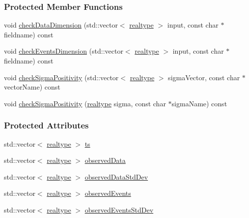 \subsubsection*{Protected Member Functions}
\begin{DoxyCompactItemize}
\item 
void \mbox{\hyperlink{classamici_1_1_exp_data_acad115e928a8b0bc8e90ebf9553d3eed}{check\+Data\+Dimension}} (std\+::vector$<$ \mbox{\hyperlink{namespaceamici_a1bdce28051d6a53868f7ccbf5f2c14a3}{realtype}} $>$ input, const char $\ast$fieldname) const
\item 
void \mbox{\hyperlink{classamici_1_1_exp_data_adcf5587f972fdef595fff78123f5118a}{check\+Events\+Dimension}} (std\+::vector$<$ \mbox{\hyperlink{namespaceamici_a1bdce28051d6a53868f7ccbf5f2c14a3}{realtype}} $>$ input, const char $\ast$fieldname) const
\item 
void \mbox{\hyperlink{classamici_1_1_exp_data_a30d756faaf9ea395446fbc5c65a7b125}{check\+Sigma\+Positivity}} (std\+::vector$<$ \mbox{\hyperlink{namespaceamici_a1bdce28051d6a53868f7ccbf5f2c14a3}{realtype}} $>$ sigma\+Vector, const char $\ast$vector\+Name) const
\item 
void \mbox{\hyperlink{classamici_1_1_exp_data_a0ed66c4deb1937ad309e8c52a452d9eb}{check\+Sigma\+Positivity}} (\mbox{\hyperlink{namespaceamici_a1bdce28051d6a53868f7ccbf5f2c14a3}{realtype}} sigma, const char $\ast$sigma\+Name) const
\end{DoxyCompactItemize}
\subsubsection*{Protected Attributes}
\begin{DoxyCompactItemize}
\item 
std\+::vector$<$ \mbox{\hyperlink{namespaceamici_a1bdce28051d6a53868f7ccbf5f2c14a3}{realtype}} $>$ \mbox{\hyperlink{classamici_1_1_exp_data_aa7014a80e7b102f85a10e3b9a480e8e5}{ts}}
\item 
std\+::vector$<$ \mbox{\hyperlink{namespaceamici_a1bdce28051d6a53868f7ccbf5f2c14a3}{realtype}} $>$ \mbox{\hyperlink{classamici_1_1_exp_data_a6acedf749a3c5e4c4dcbc822f58a565d}{observed\+Data}}
\item 
std\+::vector$<$ \mbox{\hyperlink{namespaceamici_a1bdce28051d6a53868f7ccbf5f2c14a3}{realtype}} $>$ \mbox{\hyperlink{classamici_1_1_exp_data_aa097568cebb4be48c4c1dfaab0c2a159}{observed\+Data\+Std\+Dev}}
\item 
std\+::vector$<$ \mbox{\hyperlink{namespaceamici_a1bdce28051d6a53868f7ccbf5f2c14a3}{realtype}} $>$ \mbox{\hyperlink{classamici_1_1_exp_data_a629e6085839e16bac95ef0eba580f7f0}{observed\+Events}}
\item 
std\+::vector$<$ \mbox{\hyperlink{namespaceamici_a1bdce28051d6a53868f7ccbf5f2c14a3}{realtype}} $>$ \mbox{\hyperlink{classamici_1_1_exp_data_abb12a8f75b4e6c936ae6c0be770628c9}{observed\+Events\+Std\+Dev}}
\end{DoxyCompactItemize}


